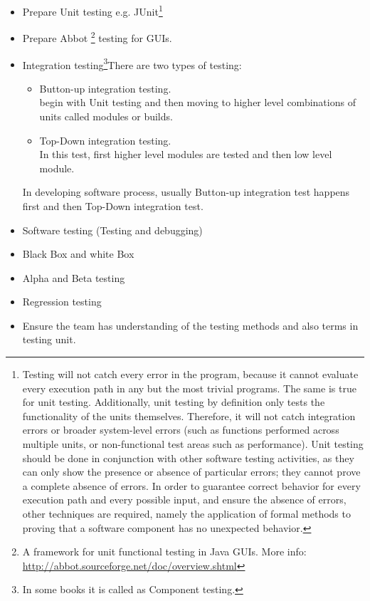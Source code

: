 \documentclass{article}
\begin{document}
\begin{itemize}
 \item Prepare Unit testing e.g. JUnit\footnote{Testing will not catch every error in the program, because it cannot evaluate every execution path in any but the most trivial programs. The same is true for unit testing. Additionally, unit testing by definition only tests the functionality of the units themselves. Therefore, it will not catch integration errors or broader system-level errors (such as functions performed across multiple units, or non-functional test areas such as performance). Unit testing should be done in conjunction with other software testing activities, as they can only show the presence or absence of particular errors; they cannot prove a complete absence of errors. In order to guarantee correct behavior for every execution path and every possible input, and ensure the absence of errors, other techniques are required, namely the application of formal methods to proving that a software component has no unexpected behavior.
}
 \item Prepare Abbot \footnote{A framework for unit functional testing in Java GUIs. More info: \url{http://abbot.sourceforge.net/doc/overview.shtml}} testing for GUIs.
 
 \begin{comment}
  Abbot is a simple framework for unit and functional testing of Java GUIs. Facilitates generating user actions and examining component state. Supports recording and playback on any Java application.
 \end{comment}
 
 \item Integration testing\footnote{In some books it is called as Component testing.}There are two types of testing:
\begin{itemize}
\item Button-up integration testing. \\
begin with Unit testing and then moving to higher level combinations of units called modules or builds.
\item Top-Down integration testing.\\
In this test, first higher level modules are tested and then low level module. 
\end{itemize}
In developing software process, usually Button-up integration test happens first and then Top-Down integration test.~\cite{sommerville2009software}

 \item Software testing (Testing and debugging)
 \item Black Box and white Box
 \item Alpha and Beta testing
 \item Regression testing
 \item Ensure the team has understanding of the testing methods and also terms in testing unit. 
\end{itemize}
\end{document}
